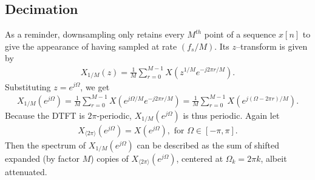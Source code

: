 \documentclass{report}
\begin{document}
\subsection{Decimation}
As a reminder, downsampling only retains every $M^{th}$ point of a sequence $x[n]$ to give the appearance of having sampled at rate $(f_s/M)$. Its $z$--transform is 
given by
\begin{align}
    X_{1/M}(z) = \frac{1}{M} \sum_{r=0}^{M-1} X\left(z^{1/M}e^{-j2\pi r/M}\right).
\end{align}
Substituting $z=e^{j\Omega}$, we get 
\begin{align}
    X_{1/M}(e^{j\Omega}) = \frac{1}{M} \sum_{r=0}^{M-1} X\left(e^{j\Omega/M}e^{-j2\pi r/M}\right) = \frac{1}{M} \sum_{r=0}^{M-1} X\left(e^{j(\Omega-2\pi r)/M}\right).
\end{align}
Because the DTFT is $2\pi$-periodic, $X_{1/M}(e^{j\Omega})$ is thus periodic. Again let 
\begin{align}
    X_{\langle2\pi\rangle}(e^{j\Omega}) = X(e^{j\Omega}), \text{ for } \Omega\in[-\pi,\pi].
\end{align}
Then the spectrum of $X_{1/M}(e^{j\Omega})$ can be described as the sum of shifted 
expanded (by factor $M$) copies of $X_{\langle2\pi\rangle}(e^{j\Omega})$, centered at $\Omega_k = 2\pi k$, albeit attenuated.
\end{document}
